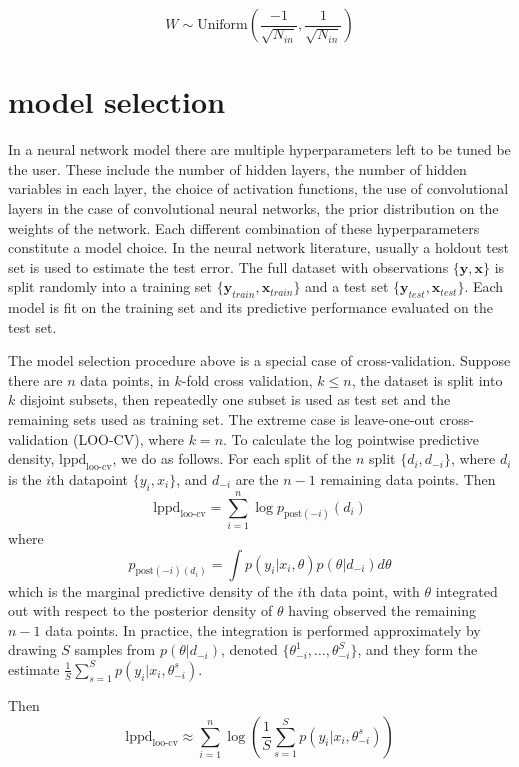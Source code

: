 \documentclass[]{report}
\begin{document}
\[ W \sim \text{Uniform}(\frac{-1}{\sqrt{N_{in}}},\frac{1}{\sqrt{N_{in}}}) \]

\section{model selection}
In a neural network model there are multiple hyperparameters left to be tuned be
the user. These include the number of hidden layers, the number of hidden
variables in each layer, the choice of activation functions, the use of
convolutional layers in the case of convolutional neural networks, the prior
distribution on the weights of the network. Each different combination of these
hyperparameters constitute a model choice. In the neural network literature,
usually a holdout test set is used to estimate the test error. The full dataset with observations
$\{\textbf{y},\textbf{x}\}$ is split randomly into a training set
$\{\textbf{y}_{train}, \textbf{x}_{train}\}$ and a test set $\{\textbf{y}_{test},
\textbf{x}_{test} \}$. Each model is fit on the training set and its predictive
performance evaluated on the test set.

The model selection procedure above is a special case of cross-validation. Suppose there are $n$ data points, in $k$-fold cross validation,
$k\le n$, the dataset is split into $k$ disjoint subsets, then repeatedly one
subset is used as test set and the remaining sets used as training set. The
extreme case is leave-one-out cross-validation (LOO-CV), where $k=n$. To
calculate the log pointwise predictive density, $\text{lppd}_{\text{loo-cv}}$, we do as
follows. For each split of the $n$ split $\{d_i,d_{-i}\}$, where $d_i$ is the
$i$th datapoint $\{y_i,x_i\}$, and $d_{-i}$ are the $n-1$ remaining data points.
Then
\[ \text{lppd}_{\text{loo-cv}} = \sum_{i=1}^n \log p_{\text{post}(-i)}(d_i) \]
where 
\[p_{\text{post}(-i)(d_i)} = \int p(y_i|x_i,\theta) p(\theta |d_{-i}) d\theta \]
which is the marginal predictive density of the $i$th data point, with $\theta$
integrated out with respect to the posterior density of $\theta$ having observed
the remaining $n-1$ data points. In practice, the integration is performed
approximately by drawing $S$ samples from $p(\theta|d_{-i})$, denoted
$\{\theta_{-i}^1,\dots, \theta_{-i}^S\}$, and they form the estimate
$\frac{1}{S} \sum_{s=1}^S p(y_i|x_i,\theta_{-i}^s) $.

Then
\[\text{lppd}_{\text{loo-cv}} \approx \sum_{i=1}^n \log (\frac{1}{S} \sum_{s=1}^S
p(y_i|x_i,\theta_{-i}^s))\]
\end{document}
